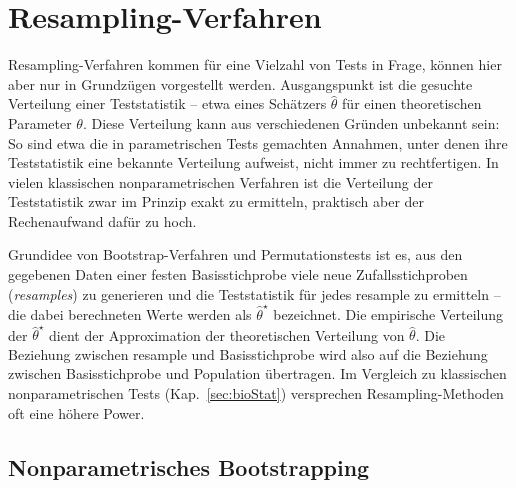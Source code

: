 \chapter{Resampling-Verfahren}
\label{sec:resampling}

Resampling-Verfahren kommen für eine Vielzahl von Tests in Frage, können hier aber nur in Grundzügen vorgestellt werden. Ausgangspunkt ist die gesuchte Verteilung einer Teststatistik -- etwa eines Schätzers $\hat{\theta}$ für einen theoretischen Parameter $\theta$. Diese Verteilung kann aus verschiedenen Gründen unbekannt sein: So sind etwa die in parametrischen Tests gemachten Annahmen, unter denen ihre Teststatistik eine bekannte Verteilung aufweist, nicht immer zu rechtfertigen. In vielen klassischen nonparametrischen Verfahren ist die Verteilung der Teststatistik zwar im Prinzip exakt zu ermitteln, praktisch aber der Rechenaufwand dafür zu hoch.

Grundidee von Bootstrap-Verfahren und Permutationstests ist es, aus den gegebenen Daten einer festen Basisstichprobe viele neue Zufallsstichproben (\emph{resamples}) zu generieren und die Teststatistik für jedes resample zu ermitteln -- die dabei berechneten Werte werden als $\hat{\theta}^{\star}$ bezeichnet. Die empirische Verteilung der $\hat{\theta}^{\star}$ dient der Approximation der theoretischen Verteilung von $\hat{\theta}$. Die Beziehung zwischen resample und Basisstichprobe wird also auf die Beziehung zwischen Basisstichprobe und Population übertragen. Im Vergleich zu klassischen nonparametrischen Tests (Kap.\ \ref{sec:bioStat}) versprechen Resampling-Methoden oft eine höhere Power.

\section{Nonparametrisches Bootstrapping}
\label{sec:boot}

